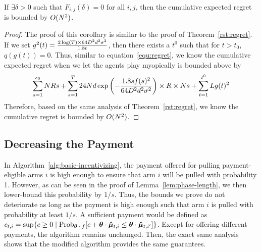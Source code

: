 \begin{corollary}
If $\exists \delta>0$ such that $F_{i,j}(\delta)=0$ for all $i,j$, then the cumulative expected regret is bounded by $O(N^2)$.
\end{corollary}

\begin{proof}
The proof of this corollary is similar to the proof of Theorem~\ref{rst:regret}. If we set $g^2(t)=\frac{2\log(T)\times 64D^2 d^2\sigma^2}{1.8t}$, then there exists a $t^{0}$ such that for $t>t_{0}$, $q(g(t))=0$. Thus, similar to equation~\eqref{equ:regret}, we know the cumulative expected regret when we let the agents play myopically is bounded above by
\begin{align}
\sum_{s=1}^{s_0}N R s + \sum_{s=1}^{T} 24N d\exp\left(-\frac{1.8s f(s)^2}{64 D^2 d^2\sigma^2}\right)\times R \times N s+ \sum_{t=1}^{t^{0}}L g(t)^2 \nonumber
\end{align}
Therefore, based on the same analysis of Theorem~\ref{rst:regret}, we know the cumulative regret is bounded by $O(N^2)$.
\end{proof}

\subsection{Decreasing the Payment} \label{sec:pi}

In Algorithm~\ref{alg:basic-incentivizing},
the payment  offered for pulling payment-eligible arms $i$
is high enough to ensure that arm $i$ will be pulled with probability 1.
However, as can be seen in the proof of Lemma~\ref{lem:phase-length},
we then lower-bound this probability by $1/s$.
Thus, the bounds we prove do not deteriorate as long as the payment is
high enough such that arm $i$ is pulled with probability at least $1/s$.
A sufficient payment would be defined as
$\Pay{t}{i} = \sup \Set{c \geq 0}{%
  \Prob[\AgV \sim \AgentDist]{c + \AgV \cdot \ArmEV{t}{i} \leq \AgV \cdot \ArmEV{t}{i'}}}$.
Except for offering different payments, the algorithm remains unchanged.
Then, the exact same analysis shows that the modified algorithm
provides the same guarantees.
